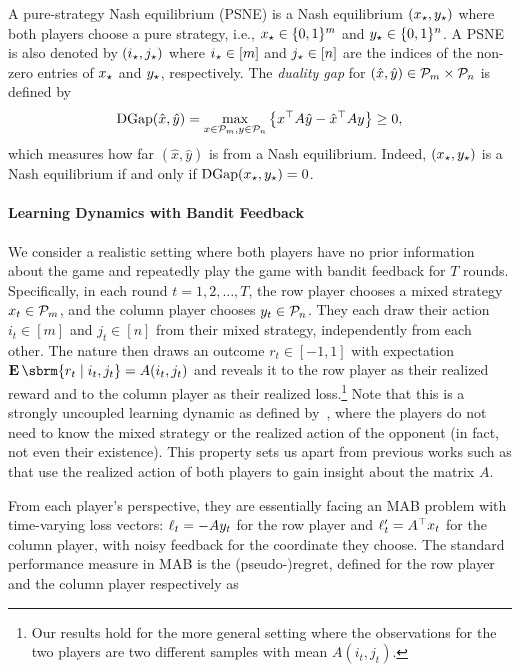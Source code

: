 A pure-strategy Nash equilibrium (PSNE) is a Nash equilibrium $(x_{\star}, y_{\star})$ where both players choose a pure strategy,
i.e.,
$x_{\star} \in \{ 0, 1 \}^m$ and $y_{\star} \in \{ 0, 1 \}^n$.
A PSNE is also denoted by $(i_{\star}, j_{\star})$ where $i_{\star} \in [m]$ and $j_{\star} \in [n]$ are the indices of the non-zero entries of $x_{\star}$ and $y_{\star}$,
respectively.
The \textit{duality gap} for $(\hat{x}, \hat{y}) \in \mathcal{P}_m \times \mathcal{P}_n$ is defined by
\begin{align}
    \label{eq:DG}
    \operatorname{DGap}(\hat{x}, \hat{y}) = \max_{x \in \mathcal{P}_m, y \in \mathcal{P}_n} \left\{ x^\top A \hat{y} - \hat{x}^\top A y \right\} \ge 0,
\end{align}
which measures how far $(\hat{x}, \hat{y})$ is from a Nash equilibrium.
Indeed,
$(x_{\star}, y_{\star})$ is a Nash equilibrium if and only if $\operatorname{DGap}(x_{\star}, y_{\star}) = 0$.


\paragraph{Learning Dynamics with Bandit Feedback}
We consider a realistic setting where both players have no prior information about the game and repeatedly play the game with bandit feedback for $T$ rounds.
Specifically, 
in each round $t = 1, 2, \ldots, T$,
the row player chooses a mixed strategy $x_t \in \mathcal{P}_m$, and the column player chooses $y_t \in \mathcal{P}_n$.
They each draw their action $i_t \in [m]$ and $j_t \in [n]$ from their mixed strategy,
independently from each other. %
The nature then draws an outcome $r_t \in [-1,1]$ with expectation $\E \sbrm{r_t \mid i_t,j_t } = A(i_t,j_t)$ and reveals it to the row player as their realized reward and to the column player as their realized loss.\footnote{Our results hold for the more general setting where the observations for the two players are two different samples with mean $A(i_t, j_t)$.}
Note that this is a strongly uncoupled learning dynamic as defined by~\citet{daskalakis2011near}, where the players do not need to know the mixed strategy or the realized action of the opponent (in fact, not even their existence).
This property sets us apart from previous works such as \citet{zhou2017identify,o2021matrix} that use the realized action of both players to gain insight about the matrix $A$.

From each player's perspective, they are essentially facing an MAB problem with time-varying loss vectors: $\ell_t = -A y_t$ for the row player and $\ell'_t = A^\top x_t$ for the column player, with noisy feedback for the coordinate they choose.
The standard performance measure in MAB is the (pseudo-)regret, defined for the row player and the column player respectively as



